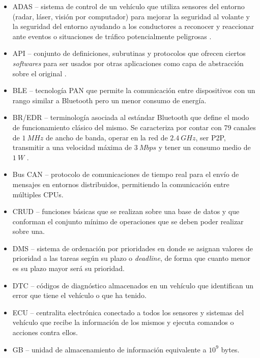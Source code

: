 \begin{itemize}
  \item \ac{ADAS} -- sistema de control de un vehículo que utiliza sensores del entorno
        (radar, láser, visión por computador) para mejorar la seguridad al volante y
        la seguridad del entorno ayudando a los conductores a reconocer y reaccionar
        ante eventos o situaciones de tráfico potencialmente peligrosas \cite{hermawanAcquisitionModelingEvaluating2020}.
  \item \ac{API} -- conjunto de definiciones, subrutinas y protocolos que ofrecen
        ciertos \textit{softwares} para ser usados por otras aplicaciones como
        capa de abstracción sobre el original \cite{InterfazProgramacionAplicaciones2021}.
  \item \ac{BLE} -- tecnología \ac{PAN} que permite la comunicación entre dispositivos
        con un rango similar a Bluetooth pero un menor consumo de energía.
  \item \ac{BR/EDR} -- terminología asociada al estándar Bluetooth que define el modo
        de funcionamiento clásico del mismo. Se caracteriza por contar con 79 canales
        de $1~MHz$ de ancho de banda, operar en la red de $2.4~GHz$, ser \ac{P2P},
        transmitir a una velocidad máxima de $3~Mbps$ y tener un consumo medio de
        $1~W$ \cite{ComparisonBluetoothBR}.
  \item Bus \ac{CAN} -- protocolo de comunicaciones de tiempo real para el envío de
        mensajes en entornos distribuidos, permitiendo la comunicación
        entre múltiples CPUs.
  \item \ac{CRUD} -- funciones básicas que se realizan sobre una base de datos y que
        conforman el conjunto mínimo de operaciones que se deben poder realizar sobre
        una.
  \item \ac{DMS} -- sistema de ordenación por prioridades en donde se asignan valores
        de prioridad a las tareas según su plazo o \textit{deadline}, de forma que cuanto
        menor es su plazo mayor será su prioridad.
  \item \ac{DTC} -- códigos de diagnóstico almacenados en un vehículo que identifican
        un error que tiene el vehículo o que ha tenido.
  \item \ac{ECU} -- centralita electrónica conectado a todos los sensores y sistemas
        del vehículo que recibe la información de los mismos y ejecuta comandos o acciones
        contra ellos.
  \item \ac{GB} -- unidad de almacenamiento de información equivalente a $10^9$ bytes.

\end{itemize}
